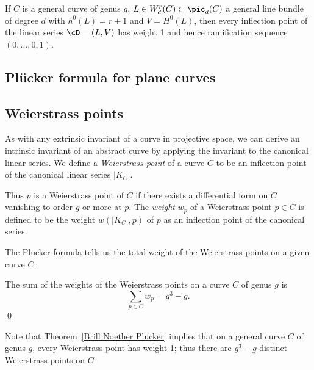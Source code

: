 \begin{theorem}\label{Brill Noether Plucker}
If $C$ is a general curve of genus $g$, $L \in W^r_d(C) \subset \pic_d(C)$ a general line bundle of degree $d$ with $h^0(L) = r+1$ and $V = H^0(L)$, then every inflection point of the linear series $\cD = (L, V)$ has weight 1 and hence ramification sequence $(0, \dots, 0, 1)$.
\end{theorem}

\subsection{Pl\"ucker formula for plane curves}\label{plane curve pluecker}
\subsection{Weierstrass points}

As with any extrinsic invariant of a curve in projective space, we can derive an intrinsic invariant of an abstract curve by applying the invariant to the canonical linear series. We define a \emph{Weierstrass point} of a curve $C$ to be an inflection point of the canonical linear series $|K_C|$. 

Thus $p$ is a Weierstrass point of $C$ if there exists a  differential form on $C$ vanishing to order $g$ or more at $p$. The \emph{weight} $w_p$ of a Weierstrass point $p \in C$  is defined to be the weight $w(|K_C|,p)$ of $p$ as an inflection point of the canonical series. 

The Pl\"ucker formula tells us  the total weight of the Weierstrass points on a given curve $C$:

\begin{corollary}\label{plucker formula}
The sum of the weights of the Weierstrass points on a curve $C$ of genus $g$ is
$$
\sum_{p \in C} w_p = g^3-g.
$$\qed
\end{corollary}

Note that Theorem~\ref{Brill Noether Plucker} implies that on a general curve $C$ of genus $g$, every Weierstrass point has weight 1; thus there are $g^3-g$ distinct Weierstrass points on $C$


